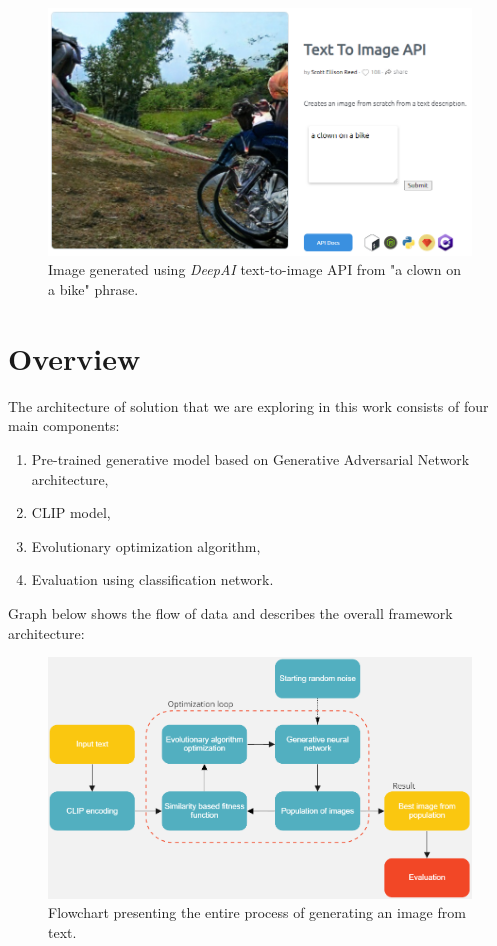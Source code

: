 \documentclass[11pt,a4paper,openany]{book}
\begin{document}
\begin{figure}[H]
    \centering
    \includegraphics[scale=0.6]{figs/deepai.png}
    \caption{Image generated using \textit{DeepAI} \cite{deepai} text-to-image API from "a clown on a bike" phrase.}\label{Fig:deepai}
\end{figure}

\section{Overview}

\noindent The architecture of solution that we are exploring in this work consists of four main components:
\begin{enumerate}
\item Pre-trained generative model based on Generative Adversarial Network architecture,
\item CLIP model,
\item Evolutionary optimization algorithm,
\item Evaluation using classification network.
\end{enumerate}
Graph below shows the flow of data and describes the overall framework architecture:\\


\begin{figure}[H]
    \centering
    \includegraphics[scale=0.6]{figs/flow.png}
    \caption{Flowchart presenting the entire process of generating an image from text.}\label{Fig:flow}
\end{figure}
\end{document}
